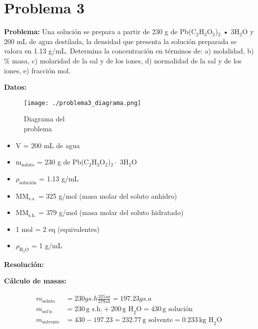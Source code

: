 \documentclass{article}
\begin{document}
\newpage
\section*{Problema 3}
\textbf{Problema:} Una solución se prepara a partir de 230 g de Pb(C$_2$H$_3$O$_2$)$_2$ • 3H$_2$O y 200 mL de agua destilada, la densidad que presenta la solución preparada se valora en 1.13 g/mL. Determina la concentración en términos de:
a) molalidad,
b) \% masa,
c) molaridad de la sal y de los iones,
d) normalidad de la sal y de los iones,
e) fracción mol.

\begin{multicols}{2} %
\noindent\textbf{Datos:} %

\begin{figure}[H]
    \begin{minipage}[t]{0.3\textwidth} %
        \raggedright %
        \texttt{[image: ./problema3\_diagrama.png]} %
        \caption{Diagrama del \\ problema}
    \end{minipage}
\end{figure}

\textbf{} %
\begin{itemize}
\item V = 200 mL de agua
\item m$_{\text{soluto}}$ = 230 g de Pb(C$_2$H$_3$O$_2$)$_2 \cdot$ 3H$_2$O
\item $\rho_{\text{solución}}$ = 1.13 g/mL
\item MM$_{\text{s.a.}}$ = 325 g/mol (masa molar del soluto anhidro)
\item MM$_{\text{s.h.}}$ = 379 g/mol (masa molar del soluto hidratado)
\item 1 mol = 2 eq (equivalentes)
\item $\rho_{\text{H}_2\text{O}}$ = 1 g/mL
\end{itemize}

\columnbreak %

\noindent\textbf{Resolución:} %

\textbf{Cálculo de masas:}

\begin{align*}
    m_{\text{soluto}} &= 230g s.h \frac{325sa}{379sh}=197.23g  s.a\\
    m_{\text{sol'n}} &= 230 \, \text{g s.h.} + 200 \, \text{g H}_2\text{O} = 430 \, \text{g solución} \\[10pt]
    m_{\text{solvente}} &= 430 - 197.23 = 232.77 \, \text{g solvente} = 0.233 \, \text{kg H}_2\text{O}
\end{align*}


\end{multicols}
\end{document}
